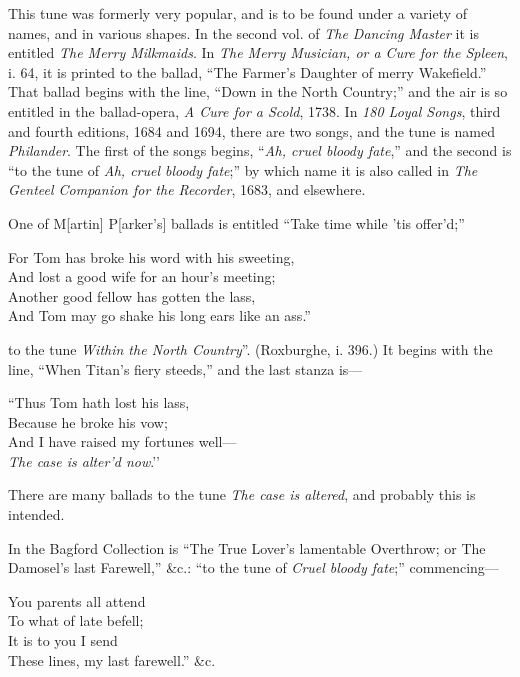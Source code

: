 \origpage{}%


This tune was formerly very popular, and is to be found under a variety of
names, and in various shapes. In the second vol. of \textit{The Dancing Master} it is
entitled \textit{The Merry Milkmaids}. In \textit{The Merry Musician, or a Cure for the
Spleen}, i. 64, it is printed to the ballad, “The Farmer’s Daughter of merry
Wakefield.” That ballad begins with the line, “Down in the North Country;”
and the air is so entitled in the ballad-opera, \textit{A Cure for a Scold}, 1738. In
\textit{180 Loyal Songs}, third and fourth editions, 1684 and 1694, there are two songs,
and the tune is named \textit{Philander}. The first of the songs begins, “\textit{Ah, cruel
bloody fate},” and the second is “to the tune of \textit{Ah, cruel bloody fate};” by which
name it is also called in \textit{The Genteel Companion for the Recorder}, 1683, and
elsewhere.

One of M[artin] P[arker’s] ballads is entitled “Take time while ’tis offer’d;”
\settowidth{\versewidth}{For Tom has broke his word with his sweeting,}
\begin{scverse}
For Tom has broke his word with his sweeting,\\
And lost a good wife for an hour’s meeting;\\
Another good fellow has gotten the lass,\\
And Tom may go shake his long ears like an ass.”
\end{scverse}
to the tune \textit{Within the North Country}”. (Roxburghe, i. 396.) It begins with
the line, “When Titan’s fiery steeds,” and the last stanza is—
\settowidth{\versewidth}{And I have raised my fortunes well—}
\begin{scverse}
\begin{altverse}
“Thus Tom hath lost his lass,\\
Because he broke his vow;\\
And I have raised my fortunes well—\\
\textit{The case is alter’d now}.’’
\end{altverse}
\end{scverse}

There are many ballads to the tune \textit{The case is altered}, and probably this is
intended.

In the Bagford Collection is “The True Lover’s lamentable Overthrow; or
The Damosel’s last Farewell,” \&c.: “to the tune of \textit{Cruel bloody fate};”
commencing—
\begin{scverse}
You parents all attend\\
To what of late befell;\\
It is to you I send\\
These lines, my last farewell.” \&c.
\end{scverse}

